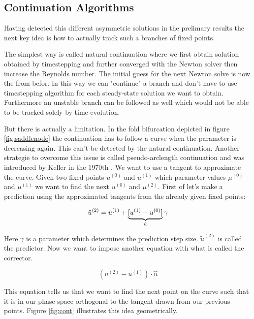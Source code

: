 \subsection{Continuation Algorithms}

Having detected this different asymmetric solutions in the prelimary results
the next key idea is how to actually track such a branches of fixed points.  

The simplest way is called natural continuation where we first obtain
solution obtained by timestepping and further converged with the Newton solver
then increase the Reynolds number. The initial guess for the next Newton solve
is now the from befor. In this way we can "continue" a branch and don't
have to use timestepping algorithm for each steady-state solution we want to
obtain. Furthermore an unstable branch can be followed as well which would not
be able to be tracked solely by time evolution.

But there is actually a limitation. In the fold bifurcation depicted in figure
\ref{fig:saddlenode} the continuation has to follow a curve when the parameter
is decreasing again. This can't be detected by the natural continuation.
Another strategie to overcome this issue is called pseudo-arclength
continuation and was introduced by Keller in the 1970th \citep{}. We want to
use a tangent to approximate the curve. Given two fixed points $u^{(0)}$ and
$u^{(1)}$  which parameter values $\mu^{(0)}$ and $\mu^{(1)}$ we want to find
the next $u^{(0)}$ and $\mu^{(2)}$. First of let's make a prediction using the approximated
tangents from the already given fixed points:

\begin{equation}
  \tilde{u}^{(2)} = u^{(1)}  + \underbrace{[u^{(1)} - u^{(0)}]}_{\text{\normalfont $\hat{u}$}} \gamma
\end{equation}

Here $\gamma$ is a parameter which determines the prediction step size.
$\tilde{u}^{(2)}$ is called the predictor. Now we want to impose another
equation with what is called the corrector.

\begin{equation}
  (u^{(2)} - u^{(1)})  \cdot \hat{u} \label{eq:extra}
\end{equation}

This equation tells us that we want to find the next point on the curve such that it   
is in our phase space orthogonal to the tangent drawn from our previous points. Figure
\ref{fig:cont} illustrates this idea geometrically.


